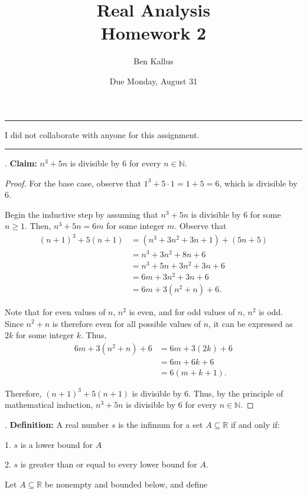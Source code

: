 \documentclass[12pt]{article}
\title{Real Analysis \\ Homework 2}
\author{Ben Kallus}
\date{Due Monday, August 31}
\begin{document}
\maketitle

\hrule
\bigskip

  I did not collaborate with anyone for this assignment.

\bigskip
\hrule

\bigskip
{}. {\bf Claim:} $n^3 + 5n$ is divisible by 6 for every $n \in \mathbb N$.
\begin{proof}

For the base case, observe that $1^3 + 5\cdot1 = 1 + 5 = 6$, which is divisible by 6.

Begin the inductive step by assuming that $n^3 + 5n$ is divisible by 6 for some $n \geq 1$.
Then, $n^3 + 5n = 6m$ for some integer $m$. Observe that 
\begin{align*}
(n+1)^3 + 5(n+1) &= (n^3 + 3n^2 + 3n + 1) + (5n + 5) \\
&= n^3 + 3n^2 + 8n + 6 \\
&= n^3 + 5n + 3n^2 + 3n + 6 \\
&= 6m + 3n^2 + 3n + 6 \\
&= 6m + 3(n^2 + n) + 6.
\end{align*}

Note that for even values of $n$, $n^2$ is even, and for odd values of $n$, $n^2$ is odd. Since $n^2 + n$ is therefore even for all possible values of $n$, it can be expressed as $2k$ for some integer $k$. Thus,
\begin{align*}
6m + 3(n^2 + n) + 6 &= 6m + 3(2k) + 6 \\
&= 6m + 6k + 6 \\
&= 6(m + k + 1).
\end{align*}

Therefore, $(n+1)^3 + 5(n+1)$ is divisible by 6. Thus, by the principle of mathematical induction, $n^3 + 5n$ is divisible by 6 for every $n \in \mathbb N$.

\end{proof}

\newpage
{}. {\bf Definition:} A real number $s$ is the infimum for a set $A \subseteq \mathbb R$ if and only if:

    1. $s$ is a lower bound for $A$
    
    2. $s$ is greater than or equal to every lower bound for $A$.
    
\newpage
{} Let $A \subseteq \mathbb R$ be nonempty and bounded below, and define 
\end{document}
